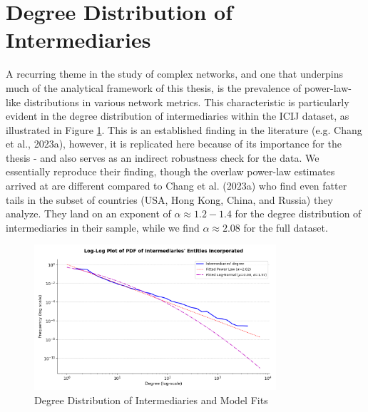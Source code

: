\newpage

\section{Degree Distribution of Intermediaries}

\label{subsubsec:degree_dist_intermediaries}
A recurring theme in the study of complex networks, and one that underpins much of the analytical framework of this thesis, is the prevalence of power-law-like distributions in various network metrics. This characteristic is particularly evident in the degree distribution of intermediaries within the ICIJ dataset, as illustrated in Figure \ref{fig:preliminary_powerlaw_fit}. This is an established finding in the literature (e.g. Chang et al., 2023a), however, it is replicated here because of its importance for the thesis - and also serves as an indirect robustness check for the data. We essentially reproduce their finding, though the overlaw power-law estimates arrived at are different compared to Chang et al. (2023a) who find even fatter tails in the subset of countries (USA, Hong Kong, China, and Russia) they analyze. They land on an exponent of $\alpha \approx 1.2-1.4$ for the degree distribution of intermediaries in their sample, while we find $\alpha \approx 2.08$ for the full dataset. 

\begin{figure}[htbp]
    \centering
    \includegraphics[width=0.8\textwidth]{images/Preliminary_Powerlaw_Fit.png} %
    \caption{Degree Distribution of Intermediaries and Model Fits}
    \label{fig:preliminary_powerlaw_fit}
\end{figure}

